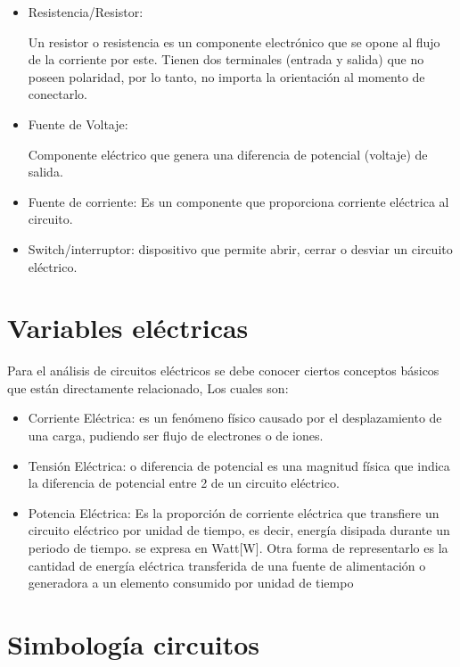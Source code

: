 \begin{itemize}
    \item Resistencia/Resistor:

Un resistor o resistencia es un componente electrónico que se opone al flujo de la corriente por este. Tienen dos terminales (entrada y salida) que no poseen polaridad, por lo tanto, no importa la orientación al momento de conectarlo.

\item Fuente de Voltaje:

Componente eléctrico que genera una diferencia de potencial (voltaje) de salida.

\item Fuente de corriente: Es un componente que proporciona corriente eléctrica al circuito.

\item Switch/interruptor:  dispositivo que permite abrir, cerrar o desviar un circuito eléctrico.
\end{itemize}

\section{Variables eléctricas}
Para el análisis de circuitos eléctricos  se debe conocer ciertos conceptos básicos que están directamente relacionado, Los cuales son:
\begin{itemize}
    \item Corriente Eléctrica: es un fenómeno físico causado por el desplazamiento de una carga, pudiendo ser flujo de electrones o de iones.
    
    \item Tensión Eléctrica: o diferencia de potencial es una magnitud física que indica la diferencia de potencial entre 2 de un circuito eléctrico.
    
    \item Potencia Eléctrica: Es la proporción de corriente eléctrica que transfiere un circuito eléctrico por unidad de tiempo, es decir, energía disipada durante un periodo de tiempo. se expresa en Watt[W]. Otra forma de representarlo es la cantidad de energía eléctrica transferida de una fuente de alimentación o generadora a un elemento consumido por unidad de tiempo
    
\end{itemize}

\section{Simbología circuitos} %

